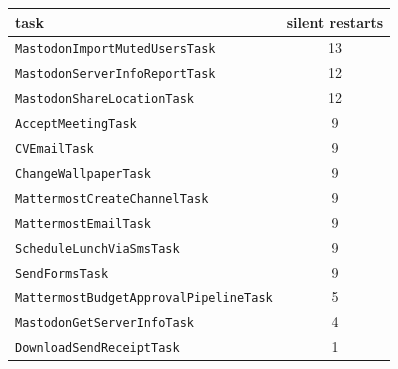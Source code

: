 \begin{tabular}{lc}
\toprule
task & silent restarts \\
\midrule
\texttt{MastodonImportMutedUsersTask} & 13 \\
\texttt{MastodonServerInfoReportTask} & 12 \\
\texttt{MastodonShareLocationTask} & 12 \\
\texttt{AcceptMeetingTask} & 9 \\
\texttt{CVEmailTask} & 9 \\
\texttt{ChangeWallpaperTask} & 9 \\
\texttt{MattermostCreateChannelTask} & 9 \\
\texttt{MattermostEmailTask} & 9 \\
\texttt{ScheduleLunchViaSmsTask} & 9 \\
\texttt{SendFormsTask} & 9 \\
\texttt{MattermostBudgetApprovalPipelineTask} & 5 \\
\texttt{MastodonGetServerInfoTask} & 4 \\
\texttt{DownloadSendReceiptTask} & 1 \\
\bottomrule
\end{tabular}
